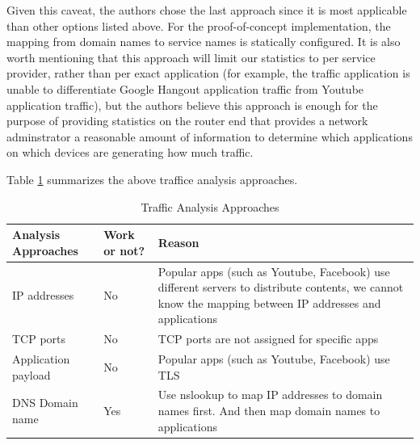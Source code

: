 \begin{itemize}
		Given this caveat, the authors chose the last approach since it is most applicable than other options listed above. For the proof-of-concept implementation, the mapping from domain names to service names is statically configured. It is also worth mentioning that this approach will limit our statistics to per service provider, rather than per exact application (for example, the traffic application is unable to differentiate Google Hangout application traffic from Youtube application traffic), but the authors believe this approach is enough for the purpose of providing statistics on the router end that provides a network adminstrator a reasonable amount of information to determine which applications on which devices are generating how much traffic.
	
	\end{itemize} 
	
Table \ref{appfilterchoice} summarizes the above traffice analysis approaches.

\begin{table}[h]
	\centering
	\caption{Traffic Analysis Approaches}
	\label{appfilterchoice}
	\begin{tabular}{p{4cm}|p{2cm}|p{10cm}} \hline
		Analysis Approaches & Work or not? & Reason \\ \hline
		IP addresses & No & Popular apps (such as Youtube, Facebook) use different servers to distribute contents, we cannot know the mapping between IP addresses and applications \\ \hline
		TCP ports & No & TCP ports are not assigned for specific apps\\ \hline
		Application payload & No  & Popular apps (such as Youtube, Facebook) use TLS\\ \hline
		DNS Domain name & Yes & Use nslookup to map IP addresses to domain names first. And then map domain names to applications \\
		\hline\end{tabular}
\end{table}
